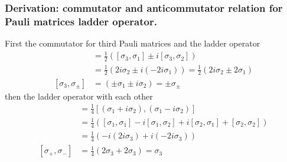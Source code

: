 \documentclass[../../../main.tex]{subfiles}
\begin{document}
\subsubsection{Derivation: commutator and anticommutator relation for Pauli matrices ladder operator.}
First the commutator for third Pauli matrices and the ladder operator
\begin{align*}
[\sigma_3, \sigma_\pm] 
& =  \frac{1}{2} \left( [\sigma_3, \sigma_1] \pm i[\sigma_3, \sigma_2] \right)\\
& =  \frac{1}{2} \left( 2i\sigma_2 \pm i(-2i\sigma_1) \right) = \frac{1}{2} \left( 2i\sigma_2 \pm 2\sigma_1 \right)\\
[\sigma_3, \sigma_\pm] 
& = (\pm \sigma_1 \pm i \sigma_2) = \pm \sigma_{\pm}
\end{align*}
then the ladder operator with each other 
\begin{align*}
[\sigma_+,\sigma_-] 
& =  \frac{1}{4} [(\sigma_1 + i\sigma_2), (\sigma_1 - i\sigma_2)]\\
& =  \frac{1}{4} \left( [\sigma_1,\sigma_1] - i[\sigma_1,\sigma_2] + i[\sigma_2,\sigma_1] + [\sigma_2,\sigma_2] \right)\\
& =  \frac{1}{4}\left( -i(2i\sigma_3) + i(-2i\sigma_3) \right) \\
[\sigma_+, \sigma_-] 
& = \frac{1}{4}(2\sigma_3 + 2\sigma_3) = \sigma_3
\end{align*}
\end{document}
